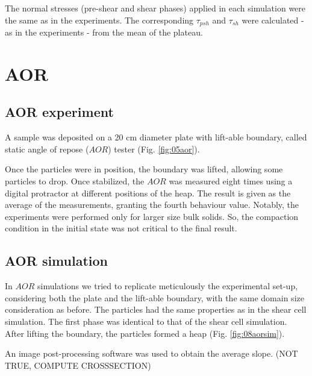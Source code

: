 \begin{appendix}
The normal stresses (pre-shear and shear phases) applied in each simulation were the same as in the experiments. The corresponding $\tau_{psh}$ and $\tau_{sh}$ were calculated - as in the experiments - from the mean of the plateau.\\

\section{AOR}
\label{sec:AOR}

\subsection{AOR experiment}
\label{subsec:aorexperiment}
A sample was deposited on a 20 cm diameter plate with lift-able boundary, called static angle of repose ($AOR$) tester (Fig. \ref{fig:05aor}).

Once the particles were in position, the boundary was lifted, allowing some particles to drop. Once stabilized, the $AOR$ was measured eight times using a digital protractor at different positions of the heap. The result is given as the average of the measurements, granting the fourth behaviour value.
Notably, the experiments were performed only for larger size bulk solids. So, the compaction condition in the initial state was not critical to the final result.

\subsection{AOR simulation}
\label{subsec:aorsimulation}
In $AOR$ simulations we tried to replicate meticulously the experimental set-up, considering both the plate and the lift-able boundary, with the same domain size consideration as before. The particles had the same properties as in the shear cell simulation. The first phase was identical to that of the shear cell simulation. 
After lifting the boundary, the particles formed a heap (Fig. \ref{fig:08aorsim}). 
 
An image post-processing software was used to obtain the average slope. (NOT TRUE, COMPUTE CROSSSECTION)

\end{appendix}\
